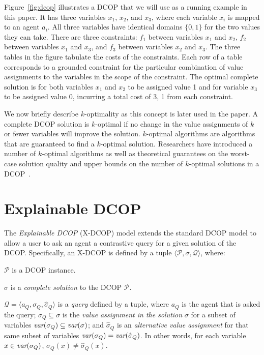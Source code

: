 \documentclass[twoside,11pt]{article}
\begin{document}
\begin{example}[DCOP]
\label{example1_dcop}
Figure~\ref{fig:dcop} illustrates a DCOP that we will use as a running example in this paper. It has three variables $x_1$, $x_2$, and $x_3$, where each variable $x_i$ is mapped to an agent $a_i$. All three variables have identical domains $\{0, 1\}$ for the two values they can take. There are three constraints: $f_1$ between variables $x_1$ and $x_2$, $f_2$ between variables $x_1$ and $x_3$, and $f_3$ between variables $x_2$ and $x_3$. The three tables in the figure tabulate the costs of the constraints. Each row of a table corresponds to a grounded constraint for the particular combination of value assignments to the variables in the scope of the constraint. The optimal complete solution is for both variables $x_1$ and $x_2$ to be assigned value 1 and for variable $x_3$ to be assigned value 0, incurring a total cost of 3, 1 from each constraint.
\end{example}

 We now briefly describe $k$-optimality as this concept is later used in the paper. A complete DCOP solution is $k$-optimal if no change in the value assignments of $k$ or fewer variables will improve the solution. $k$-optimal algorithms are algorithms that are guaranteed to find a $k$-optimal solution. Researchers have introduced a number of $k$-optimal algorithms as well as theoretical guarantees on the worst-case solution quality and upper bounds on the number of $k$-optimal solutions in a DCOP~\cite{pearce:07,BowringPPJT08,maheswaran:04b}.%

\section{Explainable DCOP}

The \emph{Explainable DCOP} (X-DCOP) model extends the standard DCOP model to allow a user to ask an agent a contrastive query for a given solution of the DCOP. Specifically, an X-DCOP is defined by a tuple $\langle \mathcal{P}, \sigma, \mathcal{Q} \rangle$, where:
\squishlist
\item $\mathcal{P}$ is a DCOP instance.
\item $\sigma$ is a \emph{complete solution} to the DCOP $\mathcal{P}$.
\item $\mathcal{Q} = \langle a_Q, \sigma_Q, \hat{\sigma}_Q \rangle$ is a \emph{query} defined by a tuple, where $a_Q$ is the agent that is asked the query; $\sigma_Q \subseteq \sigma$ is the \emph{value assignment in the solution} $\sigma$ for a subset of variables ${\textit{var}(\sigma_Q)} \subseteq {\textit{var}(\sigma)}$; and $\hat{\sigma}_Q$ is an \emph{alternative value assignment} for that same subset of variables ${\textit{var}(\sigma_Q)} = {\textit{var}(\hat{\sigma}_Q)}$. In other words, for each variable $x \in {\textit{var}(\sigma_Q)}$, $\sigma_Q(x) \neq \hat{\sigma}_Q(x)$.
\squishend
\end{document}
